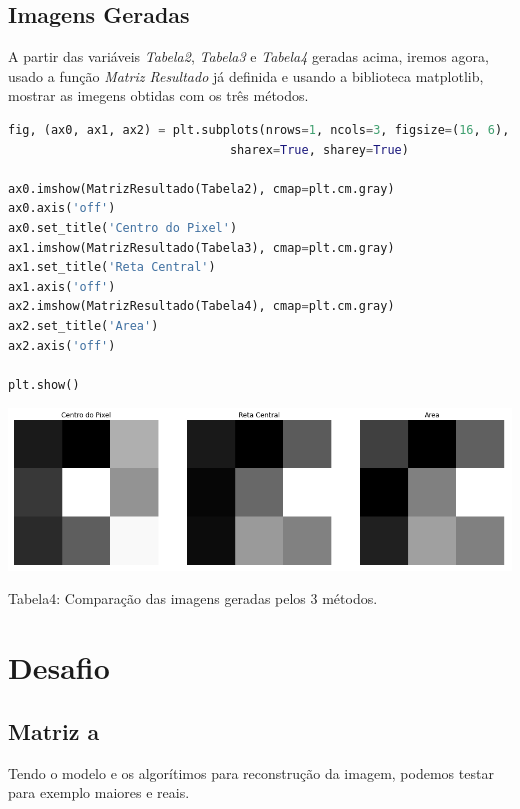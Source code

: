 \documentclass[a4paper, 12pt]{article}
\begin{document}
\subsection{Imagens Geradas}

A partir das variáveis \textit{Tabela2}, \textit{Tabela3} e \textit{Tabela4} geradas acima, iremos agora, usado a função \textit{Matriz Resultado} já definida e usando a biblioteca matplotlib, mostrar as imegens obtidas com os três métodos.

\begin{lstlisting}[language=Python, caption=Método da reta central: construindo a imagem, label=Método da reta central: construindo a imagem]
fig, (ax0, ax1, ax2) = plt.subplots(nrows=1, ncols=3, figsize=(16, 6),
                               sharex=True, sharey=True)

ax0.imshow(MatrizResultado(Tabela2), cmap=plt.cm.gray)
ax0.axis('off')
ax0.set_title('Centro do Pixel')
ax1.imshow(MatrizResultado(Tabela3), cmap=plt.cm.gray)
ax1.set_title('Reta Central')
ax1.axis('off')
ax2.imshow(MatrizResultado(Tabela4), cmap=plt.cm.gray)
ax2.set_title('Area')
ax2.axis('off')

plt.show()
\end{lstlisting}

\begin{center}
\includegraphics[width=16cm]{112_tres_metodos.PNG}

Tabela4: Comparação das imagens geradas pelos 3 métodos.   

\end{center}

\section{Desafio}

\subsection{Matriz a}

Tendo o modelo e os algorítimos para reconstrução da imagem, podemos testar para exemplo maiores e reais.
\end{document}
